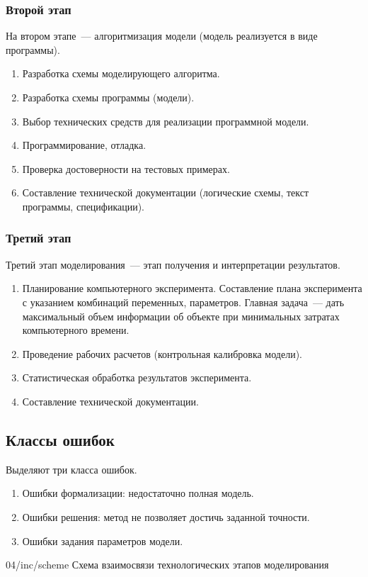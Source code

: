 \subsubsection{Второй этап}

На втором этапе~--- алгоритмизация модели (модель реализуется в виде программы).

\begin{enumerate}
    \item Разработка схемы моделирующего алгоритма.
    \item Разработка схемы программы (модели).
    \item Выбор технических средств для реализации программной модели.
    \item Программирование, отладка.
    \item Проверка достоверности на тестовых примерах.
    \item Составление технической документации (логические схемы, текст программы, спецификации).
\end{enumerate}

\subsubsection{Третий этап}

Третий этап моделирования~--- этап получения и интерпретации результатов.

\begin{enumerate}
    \item Планирование компьютерного эксперимента. Составление плана эксперимента с указанием комбинаций переменных, параметров. Главная задача~--- дать максимальный объем информации об объекте при минимальных затратах компьютерного времени.
    \item Проведение рабочих расчетов (контрольная калибровка модели).
    \item Статистическая обработка результатов эксперимента.
    \item Составление технической документации.
\end{enumerate}

\subsection{Классы ошибок}

Выделяют три класса ошибок.

\begin{enumerate}
    \item Ошибки формализации: недостаточно полная модель.
    \item Ошибки решения: метод не позволяет достичь заданной точности.
    \item Ошибки задания параметров модели.
\end{enumerate}

\image
{\textwidth}
{04/inc/scheme}
{Схема взаимосвязи технологических этапов моделирования}